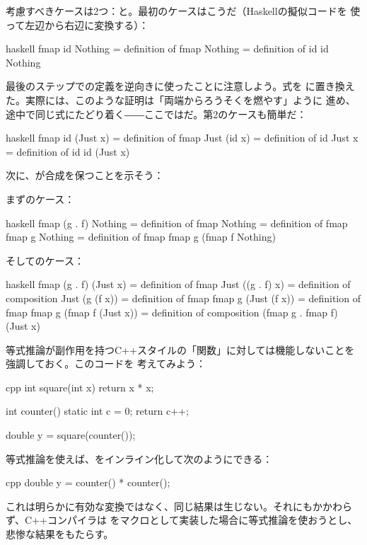考慮すべきケースは2つ：と。最初のケースはこうだ（Haskellの擬似コードを
使って左辺から右辺に変換する）：

\begin{snip}{haskell}
  fmap id Nothing
= { definition of fmap }
  Nothing
= { definition of id }
  id Nothing
\end{snip}
最後のステップでの定義を逆向きに使ったことに注意しよう。式を
に置き換えた。実際には、このような証明は「両端からろうそくを燃やす」ように
進め、途中で同じ式にたどり着く――ここではだ。第2のケースも簡単だ：

\begin{snip}{haskell}
  fmap id (Just x)
= { definition of fmap }
  Just (id x)
= { definition of id }
  Just x
= { definition of id }
  id (Just x)
\end{snip}
次に、が合成を保つことを示そう：

まずのケース：

\begin{snip}{haskell}
  fmap (g . f) Nothing
= { definition of fmap }
  Nothing
= { definition of fmap }
  fmap g Nothing
= { definition of fmap }
  fmap g (fmap f Nothing)
\end{snip}
そしてのケース：

\begin{snip}{haskell}
  fmap (g . f) (Just x)
= { definition of fmap }
  Just ((g . f) x)
= { definition of composition }
  Just (g (f x))
= { definition of fmap }
  fmap g (Just (f x))
= { definition of fmap }
  fmap g (fmap f (Just x))
= { definition of composition }
  (fmap g . fmap f) (Just x)
\end{snip}
等式推論が副作用を持つC++スタイルの「関数」に対しては機能しないことを強調しておく。このコードを
考えてみよう：

\begin{snip}{cpp}
int square(int x) {
    return x * x;
}

int counter() {
    static int c = 0;
    return c++;
}

double y = square(counter());
\end{snip}
等式推論を使えば、をインライン化して次のようにできる：

\begin{snip}{cpp}
double y = counter() * counter();
\end{snip}
これは明らかに有効な変換ではなく、同じ結果は生じない。それにもかかわらず、C++コンパイラは
をマクロとして実装した場合に等式推論を使おうとし、悲惨な結果をもたらす。


